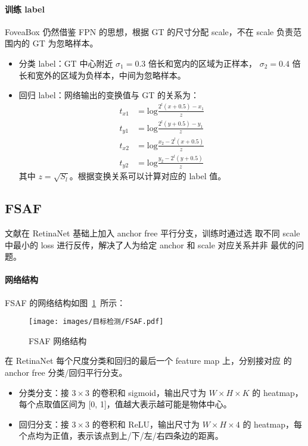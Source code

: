 \paragraph{训练 label}
FoveaBox 仍然借鉴 FPN 的思想，根据 GT 的尺寸分配 scale，不在 scale 负责范围内的
GT 为忽略样本。
\begin{itemize}
  \item 分类 label：GT 中心附近 $\sigma_1=0.3$ 倍长和宽内的区域为正样本，
    $\sigma_2=0.4$ 倍长和宽外的区域为负样本，中间为忽略样本。 
  \item 回归 label：网络输出的变换值与 GT 的关系为：
    \begin{align}
      t_{x1} & = \mathrm{log} \frac{2^l (x+0.5)-x_1}{z} \\
      t_{y1} & = \mathrm{log} \frac{2^l (y+0.5)-y_1}{z} \\
      t_{x2} & = \mathrm{log} \frac{x_2 - 2^l (x+0.5)}{z} \\
      t_{y2} & = \mathrm{log} \frac{y_2 - 2^l (y+0.5)}{z}
    \end{align}
    其中 $z = \sqrt{S_l}$。根据变换关系可以计算对应的 label 值。
\end{itemize}

\subsection{FSAF}
文献在 RetinaNet 基础上加入 anchor free 平行分支，训练时通过选
取不同 scale 中最小的 loss 进行反传，解决了人为给定 anchor 和 scale 对应关系并非
最优的问题。

\paragraph{网络结构}
FSAF 的网络结构如图~\ref{fig:FSAF}~所示：

\begin{figure}[ht]
  \centering
  \texttt{[image: images/目标检测/FSAF.pdf]}
  \caption{FSAF 网络结构}
  \label{fig:FSAF}
\end{figure}

在 RetinaNet 每个尺度分类和回归的最后一个 feature map 上，分别接对应
的 anchor free 分类/回归平行分支。

\begin{itemize}
  \item 分类分支：接 $3 \times 3$ 的卷积和 sigmoid，输出尺寸为 $W \times H \times
    K$ 的 heatmap，每个点取值区间为 [0, 1]，值越大表示越可能是物体中心。
  \item 回归分支：接 $3 \times 3$ 的卷积和 ReLU，输出尺寸为 $W \times H \times
    4$ 的 heatmap，每个点均为正值，表示该点到上/下/左/右四条边的距离。
\end{itemize}

